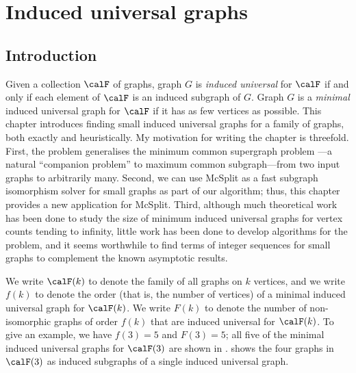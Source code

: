 \chapter{Induced universal graphs}
\label{c:universal-graphs}

%
%

\section{Introduction}

Given a collection $\calF$ of graphs, graph $G$ is \emph{induced universal} for
$\calF$ if and only if each element of $\calF$ is an induced subgraph of $G$.
Graph $G$ is a \emph{minimal} induced universal graph for $\calF$ if it has as
few vertices as possible.
This chapter introduces  finding
small induced universal graphs for a family of graphs, both exactly and heuristically.
My motivation for writing the chapter is threefold.
First, the problem generalises the minimum common supergraph problem
\cite{DBLP:journals/computing/BunkeJK00}---a natural ``companion problem''
to maximum common subgraph---from two input graphs to arbitrarily many.  Second, we
can use McSplit as a fast subgraph isomorphism solver for small graphs as part
of our algorithm; thus, this chapter provides a new application for McSplit.
Third, although much theoretical work has been done to study the size of minimum
induced universal graphs for vertex counts tending to infinity, little work has
been done to develop algorithms
for the problem, and it seems worthwhile to find terms of integer sequences for
small graphs to complement the known asymptotic results.

We write $\calF(k)$ to denote the family of all graphs on $k$ vertices,
and we write $f(k)$ to denote the order (that is, the
number of vertices) of a minimal induced universal graph for $\calF(k)$.
We write $F(k)$ to denote the number of non-isomorphic graphs of order $f(k)$
that are induced universal for $\calF(k)$.
To give an example, we have $f(3)=5$ and $F(3)=5$; all five of the minimal
induced universal graphs
for $\calF(3)$ are shown in .  shows the four
graphs in $\calF(3)$ as induced subgraphs of a single induced universal graph.


